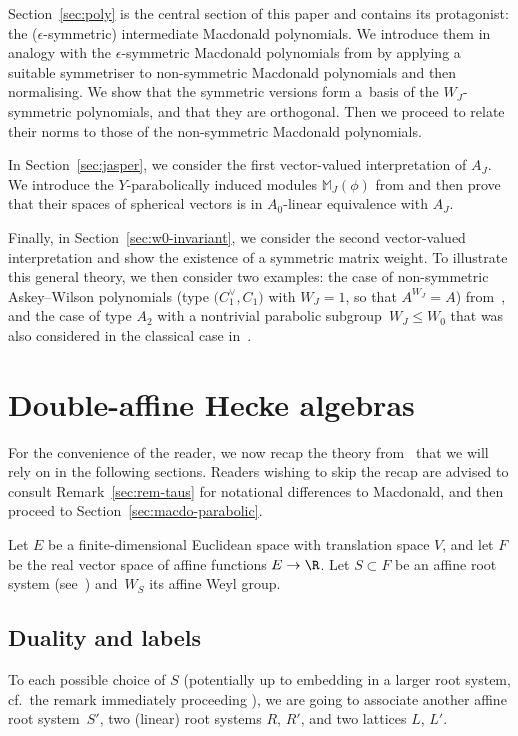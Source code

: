 \documentclass[pdftex]{sigma}
\theoremstyle{definition}
\numberwithin{equation}{section}
\begin{document}
Section~\ref{sec:poly} is the central section of this paper and contains its protagonist: the ($\epsilon$-symmetric) intermediate
Macdonald polynomials. We introduce them in analogy with the $\epsilon$-symmetric Macdonald polynomials
from \cite[Section~5.7]{macdonald} by applying a suitable symmetriser to non-symmetric Macdonald polynomials
and then normalising. We show that the symmetric versions form a~basis of the $W_J$-symmetric polynomials,
and that they are orthogonal. Then we proceed to relate their norms to those of the non-symmetric
Macdonald polynomials.

In Section~\ref{sec:jasper}, we consider the first
vector-valued interpretation of $A_J$. We introduce the $Y$-parabolically
induced modules $\mathbb{M}_J(\phi)$ from \cite[Section~3.2]{stokmanInduced} and then prove that their spaces of spherical vectors
is in $A_0$-linear equivalence with $A_J$.

Finally, in Section~\ref{sec:w0-invariant}, we consider the second vector-valued interpretation
and show the existence of a symmetric matrix weight.
To illustrate this general theory, we then consider two examples: the case
of non-symmetric Askey--Wilson polynomials
\big(type $\bigl(C_1^\vee, C_1\bigr)$ with $W_J=1$, so that $A^{W_J}=A$\big) from~\cite{koornwinderBouzeffour}, and the case
of type $A_2$ with a nontrivial parabolic subgroup~${W_J\le W_0}$ that was also considered in the classical case
in~\cite{mvpVectorValued}.

\section{Double-affine Hecke algebras}\label{sec:daha-general}
For the convenience of the reader, we now recap the theory from~\cite{macdonald} that we will rely on in
the following sections. Readers wishing to skip the recap are advised to consult Remark~\ref{sec:rem-taus}
for notational differences to Macdonald, and then proceed to Section~\ref{sec:macdo-parabolic}.

Let $E$ be a finite-dimensional Euclidean space with translation space $V$, and let $F$ be the
real vector space of affine functions $E\to\R$. Let $S\subset F$ be an affine root system (see~\cite{macdoARS}) and~$W_S$ its affine Weyl group.

\subsection{Duality and labels}
To each possible choice of $S$ (potentially up to embedding in a larger
root system, cf.\ the remark immediately proceeding \cite[Section~1.4]{macdonald}), we are going to associate another affine root system~$S'$, two
(linear) root systems $R$, $R'$, and two lattices $L$, $L'$.
\end{document}
